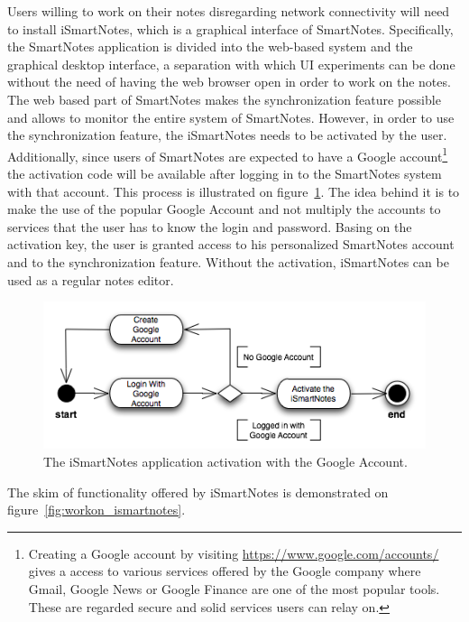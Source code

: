 Users willing to work on their notes disregarding network connectivity will need to install iSmartNotes, which is a graphical interface of SmartNotes. Specifically, the SmartNotes application is divided into the web-based system and the graphical desktop interface, a separation with which UI experiments can be done without the need of having the web browser open in order to work on the notes. The web based part of SmartNotes makes the synchronization feature possible and allows to monitor the entire system of SmartNotes. However, in order to use the synchronization feature, the iSmartNotes needs to be activated by the user. Additionally, since users of SmartNotes are expected to have a Google account\footnote{Creating a Google account by visiting \url{https://www.google.com/accounts/} gives a access to various services offered by the Google company where Gmail, Google News or Google Finance are one of the most popular tools. These are regarded secure and solid services users can relay on.} the activation code will be available after logging in to the SmartNotes system with that account. This process is illustrated on figure~\ref{fig:ismartnotes_activation}. The idea behind it is to make the use of the popular Google Account and not multiply the accounts to services that the user has to know the login and password. Basing on the activation key, the user is granted access to his personalized SmartNotes account and to the synchronization feature. Without the activation, iSmartNotes can be used as a regular notes editor.  
\begin{figure}[ht]
\begin{center}
\includegraphics[scale=0.6]{charts/activate_iSmartNotes.png}
\caption{The iSmartNotes application activation with the Google Account.}
\label{fig:ismartnotes_activation}
\end{center}
\end{figure}
The skim of functionality offered by iSmartNotes is demonstrated on figure~\ref{fig:workon_ismartnotes}.
